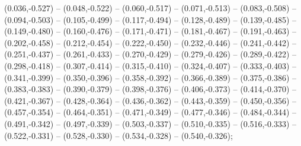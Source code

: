 (0.036,-0.527) -- (0.048,-0.522) -- (0.060,-0.517) -- (0.071,-0.513) -- (0.083,-0.508) -- (0.094,-0.503) -- (0.105,-0.499) -- (0.117,-0.494) -- (0.128,-0.489) -- (0.139,-0.485) -- (0.149,-0.480) -- (0.160,-0.476) -- (0.171,-0.471) -- (0.181,-0.467) -- (0.191,-0.463) -- (0.202,-0.458) -- (0.212,-0.454) -- (0.222,-0.450) -- (0.232,-0.446) -- (0.241,-0.442) -- (0.251,-0.437) -- (0.261,-0.433) -- (0.270,-0.429) -- (0.279,-0.426) -- (0.289,-0.422) -- (0.298,-0.418) -- (0.307,-0.414) -- (0.315,-0.410) -- (0.324,-0.407) -- (0.333,-0.403) -- (0.341,-0.399) -- (0.350,-0.396) -- (0.358,-0.392) -- (0.366,-0.389) -- (0.375,-0.386) -- (0.383,-0.383) -- (0.390,-0.379) -- (0.398,-0.376) -- (0.406,-0.373) -- (0.414,-0.370) -- (0.421,-0.367) -- (0.428,-0.364) -- (0.436,-0.362) -- (0.443,-0.359) -- (0.450,-0.356) -- (0.457,-0.354) -- (0.464,-0.351) -- (0.471,-0.349) -- (0.477,-0.346) -- (0.484,-0.344) -- (0.491,-0.342) -- (0.497,-0.339) -- (0.503,-0.337) -- (0.510,-0.335) -- (0.516,-0.333) -- (0.522,-0.331) -- (0.528,-0.330) -- (0.534,-0.328) -- (0.540,-0.326);
